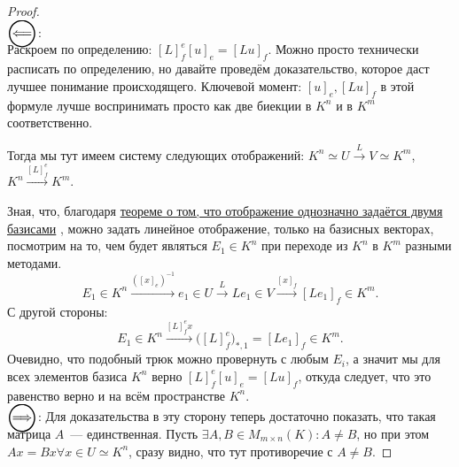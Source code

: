 \begin{proof}\leavevmode\\
    $\ola$:\\
    Раскроем по определению: $[L]^e_f[u]_e=[Lu]_f$.
    Можно просто технически расписать по определению, но давайте проведём доказательство,
    которое даст лучшее понимание происходящего. Ключевой момент: $[u]_e, [Lu]_f$ в этой
    формуле лучше воспринимать просто как две биекции в $K^n$ и в $K^m$ соответственно.

    Тогда мы тут имеем систему следующих отображений:
    $K^n \simeq U \xrightarrow{L} V \simeq K^m$,
    $K^n\xrightarrow{[L]^e_f} K^m$.

    Зная, что, благодаря 
    \hyperref[thm:Линейное отображение однозначно задаётся двумя базисами]
    {теореме о том, что отображение однозначно задаётся двумя базисами}
    , можно задать линейное отображение, только на базисных векторах, посмотрим на то, чем
    будет являться $E_1\in K^n$ при переходе из $K^n$ в $K^m$ разными методами.
    \[
        E_1\in K^n \xrightarrow{([x]_e)^{-1}} e_1 \in U \xrightarrow{L} Le_1 \in V
        \xrightarrow{[x]_f} [Le_1]_f\in K^m
    .\]
    С другой стороны:
    \[
        E_1\in K^n\xrightarrow{[L]^e_fx} \Big([L]^e_f\Big)_{*, 1} = [Le_1]_f\in K^m
    .\] 
    Очевидно, что подобный трюк можно провернуть с любым $E_i$, а значит мы для всех
    элементов базиса $K^n$ верно $[L]^e_f[u]_e=[Lu]_f$, откуда следует, что это равенство
    верно и на всём пространстве $K^n$.\\
    $\ora$:
    Для доказательства в эту сторону теперь достаточно показать, что такая матрица $A$~---
    единственная. Пусть $\exists A,B\in M_{m\times n}(K)\colon A \not = B$, но при этом 
    $Ax = Bx \forall x\in U\simeq K^n$, сразу видно, что тут противоречие с $A\not=B$.
\end{proof}
